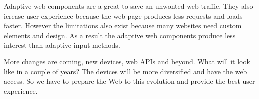 \documentclass{iitsrc}
\begin{document}
Adaptive web components are a great to save an unwonted web traffic. They also icrease user experience because the web page produces less requests and loads faster. However the limitations also exist because many websites need custom elements and design. As a result the adaptive web components produce less interest than adaptive input methods.

More changes are coming, new devices, web APIs and beyond. What will it look like in a couple of years? The devices will be more diversified and have the web access. So we have to prepare the Web to this evolution and provide the best user experience.




\end{document}
